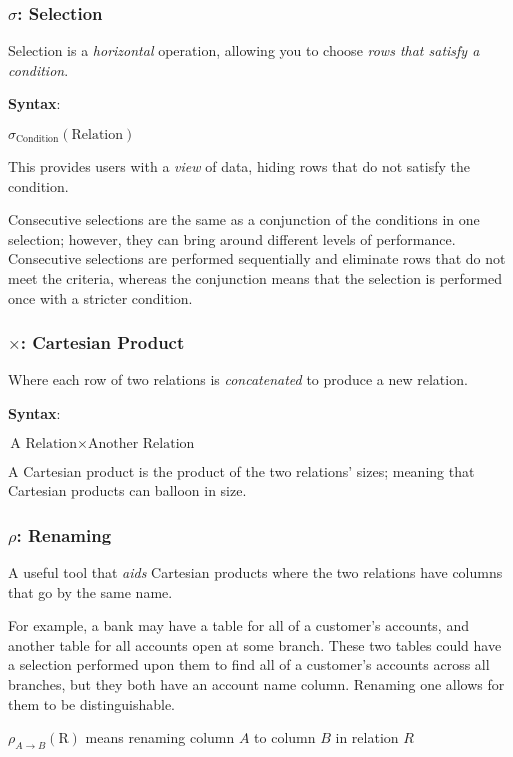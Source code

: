 \documentclass{article}
\begin{document}
\subsubsection*{$\sigma$: Selection}

Selection is a \textit{horizontal} operation, allowing you to choose \textit{rows that satisfy a condition}.

\textbf{Syntax}:

$\sigma_{\text{Condition}}(\text{Relation})$

This provides users with a \textit{view} of data, hiding rows that do not satisfy the condition.

Consecutive selections are the same as a conjunction of the conditions in one selection; however, they can bring around different levels of performance. Consecutive selections are performed sequentially and eliminate rows that do not meet the criteria, whereas the conjunction means that the selection is performed once with a stricter condition.

\subsubsection*{$\times$: Cartesian Product}

Where each row of two relations is \textit{concatenated} to produce a new relation.

\textbf{Syntax}:

$\text{A Relation} \times \text{Another Relation}$

A Cartesian product is the product of the two relations' sizes; meaning that Cartesian products can balloon in size.

\subsubsection*{$\rho$: Renaming}

A useful tool that \textit{aids} Cartesian products where the two relations have columns that go by the same name.

For example, a bank may have a table for all of a customer's accounts, and another table for all accounts open at some branch. These two tables could have a selection performed upon them to find all of a customer's accounts across all branches, but they both have an account name column. Renaming one allows for them to be distinguishable.

$\rho_{A \rightarrow B}(\text{R})$ means renaming column $A$ to column $B$ in relation $R$
\end{document}
